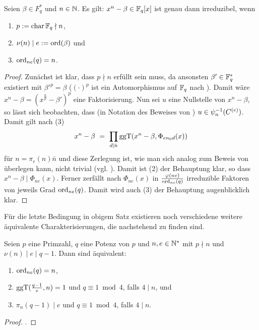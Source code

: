 \begin{satz}
  \label{satz:binom_irreduzibel}
  Seien $\beta \in F_q^\ast$ und $n\in \mathbb{N}$. Es gilt:
  $x^n -\beta \in \mathbb{F}_q[x]$ ist genau
  dann irreduzibel, wenn 
  \begin{enumerate}
    \item $p := \operatorname{char} \mathbb{F}_q \nmid n$,
    \item $\nu(n) \mid e := \operatorname{ord}(\beta)$ und
    \item $\operatorname{ord}_{ne}(q) = n$.
  \end{enumerate}
\end{satz}
\begin{proof}
  Zunächst ist klar, dass $p \nmid n$ erfüllt sein muss, da ansonsten 
  $\beta' \in \mathbb{F}_q^\ast$ existiert mit $\beta'^p = \beta$ ($(\cdot)^p$ ist ein
  Automorphismus auf $\mathbb{F}_q$ nach ). Damit wäre
  $x^n-\beta = (x^\frac n p - \beta')^p$ eine Faktorisierung.
  Nun sei $u$ eine Nullstelle von $x^n-\beta$, so lässt sich beobachten, dass
  (in Notation des Beweises von
  )
  $u \in \psi_n^{-1}(C^{(e)})$. Damit gilt nach
   (3)
  \[ x^n-\beta \ =\  \prod_{d\mid \bar n} \operatorname{ggT}(x^n-\beta, \Phi_{en_0d}(x))\]
  für $n = \pi_{e}(n) \bar n$ und diese Zerlegung ist, wie man sich analog zum
  Beweis von  überlegen kann, 
  nicht trivial (vgl. \autocite[Theorem \ldots]{hachenberger2015}). 
  Damit ist (2) der Behauptung
  klar, so dass $x^n-\beta \mid \Phi_{ne}(x)$. Ferner zerfällt nach
   $\Phi_{ne}(x)$ in 
  $\frac{\varphi(ne)}{\operatorname{ord}_{ne}(q)}$ irreduzible Faktoren von jeweils Grad
  $\operatorname{ord}_{ne}(q)$. Damit wird auch (3) der Behauptung augenblicklich klar.
\end{proof}

Für die letzte Bedingung in obigem Satz existieren noch verschiedene weitere
äquivalente Charakterisierungen, die nachstehend zu finden sind.

\begin{satz}
  \label{satz:binom_irreduzibel_aquiv}
  Seien $p$ eine Primzahl, $q$ eine Potenz von $p$ und $n,e\in \mathbb{N}^\ast$ 
  mit $p\nmid n$ und $\nu(n)\mid e\mid q-1$. Dann sind äquivalent:
  \begin{enumerate}
    \item $\operatorname{ord}_{ne}(q)  = n$,
    \item $\operatorname{ggT}(\tfrac{q-1}{e},n)=1$ und $q\equiv 1 \bmod 4$, falls $4\mid n$,
      und
    \item $\pi_n(q-1) \mid e$ und $q\equiv 1 \bmod 4$, falls $4\mid n$.
  \end{enumerate}
\end{satz}
\begin{proof}
  \autocite[Theorem \ldots]{hachenberger2015}.
\end{proof}


